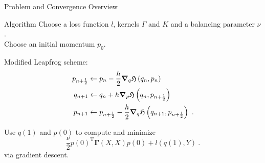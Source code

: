 \documentclass[8pt]{beamer}
\newcommand{\cX}{\mathcal{X}}
\newcommand{\cY}{\mathcal{Y}}
\newcommand{\fH}{\mathfrak{H}}
\newcommand{\T}{\mathrm{T}}
\begin{document}
	\begin{frame}{Problem and Convergence Overview}
		
	\end{frame}

	\begin{frame}{Algorithm}
		Choose a loss function $l$, kernels $\Gamma$ and $K$ and a balancing parameter $\nu$.\\
		Choose an initial momentum $p_0$.
		
		Modified Leapfrog scheme:
		\begin{align*}
			p_{n+\frac{1}{2}} &\gets p_n - \frac{h}{2} \grad_q\fH\left(q_n, p_n\right) \\
			q_{n+1} &\gets q_n + h \grad_p\fH\left(q_n, p_{n+\frac{1}{2}}\right)\\
			p_{n+1} &\gets p_{n+\frac{1}{2}} - \frac{h}{2} \grad_q\fH\left(q_{n+1}, p_{n+\frac{1}{2}}\right) \ .
		\end{align*}
		
		Use $q(1)$ and $p(0)$ to compute and minimize
		\begin{equation*}
			\frac{\nu}{2} p(0)^\T \mathbf{\Gamma}(X, X)p(0) + l(q(1), Y) \ .
		\end{equation*}
		via gradient descent.
	\end{frame}
\end{document}
